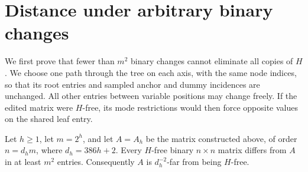 \section{Distance under arbitrary binary changes}
\label{sec:distance}

We first prove that fewer than $m^2$ binary changes cannot eliminate
all copies of $H$. We choose one path through the tree on each axis,
with the same node indices, so that its root entries and sampled anchor
and dummy incidences are unchanged. All other entries between variable
positions may change freely. If the edited matrix were $H$-free, its
mode restrictions would then force opposite values on the shared leaf
entry.

\begin{proposition}\label{prop:distance}
Let $h\geq 1$, let $m=2^h$, and let $A=A_h$ be the matrix constructed
above, of order $n=d_hm$, where $d_h=386h+2$.  Every $H$-free binary
$n\times n$ matrix differs from $A$ in at least $m^2$ entries.
Consequently $A$ is $d_h^{-2}$-far from being $H$-free.
\end{proposition}

